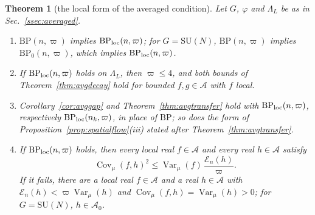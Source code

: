 \documentclass[aps,prd,twocolumn,superscriptaddress,nofootinbib,longbibliography,floatfix,amsmath,amssymb,10pt]{revtex4-2}
\newtheorem{theorem}{Theorem}
\theoremstyle{definition}
\theoremstyle{remark}
\newcommand{\SU}{\mathrm{SU}}
\newcommand{\Cov}{\operatorname{Cov}}
\newcommand{\Var}{\operatorname{Var}}
\begin{document}
\begin{theorem}[the local form of the averaged condition]\label{thm:bplocal}
Let $G$, $\varphi$ and $\Lambda_L$ be as in Sec.~\ref{ssec:averaged}.
\begin{enumerate}[label=\textup{(\roman*)},leftmargin=*]
\item $\mathrm{BP}(n,\varpi)$ implies $\mathrm{BP}_{\rm loc}(n,\varpi)$; for
$G=\SU(N)$, $\mathrm{BP}(n,\varpi)$ implies $\mathrm{BP}_0(n,\varpi)$, which
implies $\mathrm{BP}_{\rm loc}(n,\varpi)$.
\item If $\mathrm{BP}_{\rm loc}(n,\varpi)$ holds on $\Lambda_L$, then
$\varpi\le4$, and both bounds of Theorem~\ref{thm:avgdecay} hold for bounded
$f,g\in\mathcal A$ with $f$ local.
\item Corollary~\ref{cor:avggap} and Theorem~\ref{thm:avgtransfer} hold with
$\mathrm{BP}_{\rm loc}(n,\varpi)$, respectively $\mathrm{BP}_{\rm loc}(n_k,
\varpi)$, in place of $\mathrm{BP}$; so does the form of
Proposition~\ref{prop:spatialflow}\textup{(iii)} stated after
Theorem~\ref{thm:avgtransfer}.
\item If $\mathrm{BP}_{\rm loc}(n,\varpi)$ holds, then every local real
$f\in\mathcal A$ and every real $h\in\mathcal A$ satisfy
\[
\Cov_\mu(f,h)^2\le\Var_\mu(f)\,\frac{\mathcal E_n(h)}{\varpi}.
\]
If it fails, there are a local real $f\in\mathcal A$ and a real $h\in
\mathcal A$ with $\mathcal E_n(h)<\varpi\Var_\mu(h)$ and $\Cov_\mu(f,h)=
\Var_\mu(h)>0$; for $G=\SU(N)$, $h\in\mathcal A_0$.
\end{enumerate}
\end{theorem}
\end{document}
